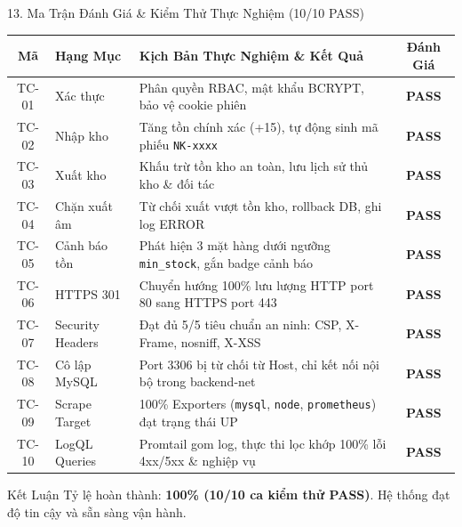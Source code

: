 \documentclass[aspectratio=169,10pt]{beamer}
\begin{document}
\begin{frame}{13. Ma Trận Đánh Giá \& Kiểm Thử Thực Nghiệm (10/10 PASS)}
    \begin{center}
        \scriptsize
        \begin{tabular}{c l p{} c}
            \toprule
            \textbf{Mã} & \textbf{Hạng Mục} & \textbf{Kịch Bản Thực Nghiệm \& Kết Quả} & \textbf{Đánh Giá} \\
            \midrule
            TC-01 & Xác thực & Phân quyền RBAC, mật khẩu BCRYPT, bảo vệ cookie phiên & \textbf{PASS} \\
            TC-02 & Nhập kho & Tăng tồn chính xác (+15), tự động sinh mã phiếu \texttt{NK-xxxx} & \textbf{PASS} \\
            TC-03 & Xuất kho & Khấu trừ tồn kho an toàn, lưu lịch sử thủ kho \& đối tác & \textbf{PASS} \\
            TC-04 & Chặn xuất âm & Từ chối xuất vượt tồn kho, rollback DB, ghi log ERROR & \textbf{PASS} \\
            TC-05 & Cảnh báo tồn & Phát hiện 3 mặt hàng dưới ngưỡng \texttt{min\_stock}, gắn badge cảnh báo & \textbf{PASS} \\
            TC-06 & HTTPS 301 & Chuyển hướng 100\% lưu lượng HTTP port 80 sang HTTPS port 443 & \textbf{PASS} \\
            TC-07 & Security Headers & Đạt đủ 5/5 tiêu chuẩn an ninh: CSP, X-Frame, nosniff, X-XSS & \textbf{PASS} \\
            TC-08 & Cô lập MySQL & Port 3306 bị từ chối từ Host, chỉ kết nối nội bộ trong backend-net & \textbf{PASS} \\
            TC-09 & Scrape Target & 100\% Exporters (\texttt{mysql}, \texttt{node}, \texttt{prometheus}) đạt trạng thái UP & \textbf{PASS} \\
            TC-10 & LogQL Queries & Promtail gom log, thực thi lọc khớp 100\% lỗi 4xx/5xx \& nghiệp vụ & \textbf{PASS} \\
            \bottomrule
        \end{tabular}
    \end{center}
    \begin{exampleblock}{Kết Luận}
        Tỷ lệ hoàn thành: \textbf{100\% (10/10 ca kiểm thử PASS)}. Hệ thống đạt độ tin cậy và sẵn sàng vận hành.
    \end{exampleblock}
\end{frame}
\end{document}
